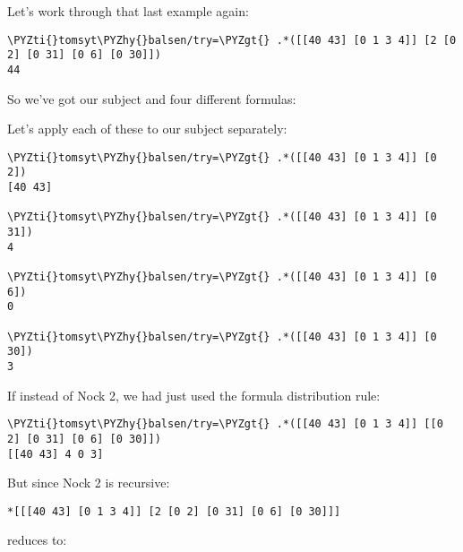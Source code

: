 Let's work through that last example again:

\begin{framed_shaded}
\begin{Verbatim}[fontsize=\relsize{-2.5},commandchars=\\\{\}]
\PYZti{}tomsyt\PYZhy{}balsen/try=\PYZgt{} .*([[40 43] [0 1 3 4]] [2 [0 2] [0 31] [0 6] [0 30]])
44
\end{Verbatim}
\end{framed_shaded}

So we've got our subject \kode{[[40 43] [0 1 3 4]]} and four different formulas:
\kode{[0 2] [0 31] [0 6] [0 30]}

Let's apply each of these to our subject separately:

\begin{framed_shaded}
\begin{Verbatim}[fontsize=\relsize{-2.5},commandchars=\\\{\}]
\PYZti{}tomsyt\PYZhy{}balsen/try=\PYZgt{} .*([[40 43] [0 1 3 4]] [0 2])
[40 43]

\PYZti{}tomsyt\PYZhy{}balsen/try=\PYZgt{} .*([[40 43] [0 1 3 4]] [0 31])
4

\PYZti{}tomsyt\PYZhy{}balsen/try=\PYZgt{} .*([[40 43] [0 1 3 4]] [0 6])
0

\PYZti{}tomsyt\PYZhy{}balsen/try=\PYZgt{} .*([[40 43] [0 1 3 4]] [0 30])
3
\end{Verbatim}
\end{framed_shaded}

If instead of Nock 2, we had just used the formula distribution rule:

\begin{framed_shaded}
\begin{Verbatim}[fontsize=\relsize{-2.5},commandchars=\\\{\}]
\PYZti{}tomsyt\PYZhy{}balsen/try=\PYZgt{} .*([[40 43] [0 1 3 4]] [[0 2] [0 31] [0 6] [0 30]])
[[40 43] 4 0 3]
\end{Verbatim}
\end{framed_shaded}

But since Nock 2 is recursive:

\begin{framed_shaded}
\begin{Verbatim}[fontsize=\relsize{-2.5},commandchars=\\\{\}]
*[[[40 43] [0 1 3 4]] [2 [0 2] [0 31] [0 6] [0 30]]]
\end{Verbatim}
\end{framed_shaded}
reduces to:


